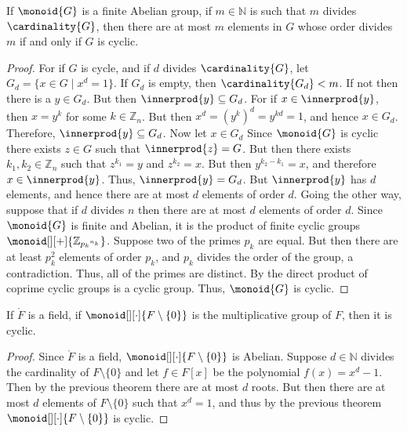 \documentclass{article}                                                        %
\begin{document}
        \begin{theorem}
            If $\monoid{G}$ is a finite Abelian group, if $m\in\mathbb{N}$ is
            such that $m$ divides $\cardinality{G}$, then there are at most
            $m$ elements in $G$ whose order divides $m$ if and only if $G$ is
            cyclic.
        \end{theorem}
        \begin{proof}
            For if $G$ is cycle, and if $d$ divides $\cardinality{G}$, let
            $G_{d}=\{x\in{G}\;|\;x^{d}=1\}$. If $G_{d}$ is empty, then
            $\cardinality{G_{d}}<m$. If not then there is a $y\in{G}_{d}$.
            But then $\innerprod{y}\subseteq{G}_{d}$. For if
            $x\in\innerprod{y}$, then $x=y^{k}$ for some $k\in\mathbb{Z}_{n}$.
            But then $x^{d}=(y^{k})^{d}=y^{kd}=1$, and hence $x\in{G}_{d}$.
            Therefore, $\innerprod{y}\subseteq{G}_{d}$. Now let $x\in{G}_{d}$
            Since $\monoid{G}$ is cyclic there exists $z\in{G}$ such that
            $\innerprod{z}=G$. But then there exists
            $k_{1},k_{2}\in\mathbb{Z}_{n}$ such that $z^{k_{1}}=y$ and
            $z^{k_{2}}=x$. But then $y^{k_{2}-k_{1}}=x$, and therefore
            $x\in\innerprod{y}$. Thus, $\innerprod{y}=G_{d}$. But
            $\innerprod{y}$ has $d$ elements, and hence there are at most $d$
            elements of order $d$. Going the other way, suppose that if $d$
            divides $n$ then there are at most $d$ elements of order $d$.
            Since $\monoid{G}$ is finite and Abelian, it is the product of
            finite cyclic groups $\monoid[][+]{\mathbb{Z}_{{p_{k}}^{n_{k}}}}$.
            Suppose two of the primes $p_{k}$ are equal. But then there are at
            least $p_{k}^{2}$ elements of order $p_{k}$, and $p_{k}$ divides the
            order of the group, a contradiction. Thus, all of the primes are
            distinct. By the direct product of coprime cyclic groups is a cyclic
            group. Thus, $\monoid{G}$ is cyclic.
        \end{proof}
        \begin{theorem}
            If $\ring{F}$ is a field, if $\monoid[][\cdot]{F\setminus\{0\}}$ is
            the multiplicative group of $F$, then it is cyclic.
        \end{theorem}
        \begin{proof}
            Since $\ring{F}$ is a field, $\monoid[][\cdot]{F\setminus\{0\}}$ is
            Abelian. Suppose $d\in\mathbb{N}$ divides the cardinality of
            $F\setminus\{0\}$ and let $f\in{F}[x]$ be the polynomial
            $f(x)=x^{d}-1$. Then by the previous theorem there are at most
            $d$ roots. But then there are at most $d$ elements of
            $F\setminus\{0\}$ such that $x^{d}=1$, and thus by the previous
            theorem $\monoid[][\cdot]{F\setminus\{0\}}$ is cyclic.
        \end{proof}
\end{document}
